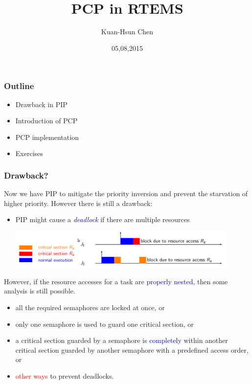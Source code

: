\documentclass[t]{beamer}
\title{PCP in RTEMS}
\author{Kuan-Hsun Chen}
\institute{LS 12, TU Dortmund}
\date{05,08,2015}
\newcommand{\red}[1]{\textcolor{red}{#1}}
\newcommand{\blue}[1]{\textcolor{blue}{#1}}
\begin{document}
\maketitle

\begin{frame}
\frametitle{Outline}

\begin{itemize}

\item Drawback in PIP

\item Introduction of PCP

\item PCP implementation

\item Exercises

\end{itemize} %
\end{frame}

\begin{frame}
\frametitle{Drawback?}
Now we have PIP to mitigate the priority inversion and prevent the starvation of higher priority. However there is still a drawback:
\begin{itemize}
  \item PIP might cause a \emph{\textcolor{blue}{deadlock}} if there are
  multiple resources

    \includegraphics[width=0.9\textwidth]{PIP-deadlock}

  \end{itemize}
  
  However, if the resource accesses for a task are \blue{properly
    nested}, then some analysis is still possible.
  \begin{itemize}
  \item all the required semaphores are locked at once, or
  \item only one semaphore is used to guard one critical section, or
  \item a critical section guarded by a semaphore is \blue{completely} within another
    critical section guarded by another semaphore with a predefined
    access order, or
  \item \red{other ways} to prevent deadlocks. 
  \end{itemize}
\end{frame}
\end{document}
